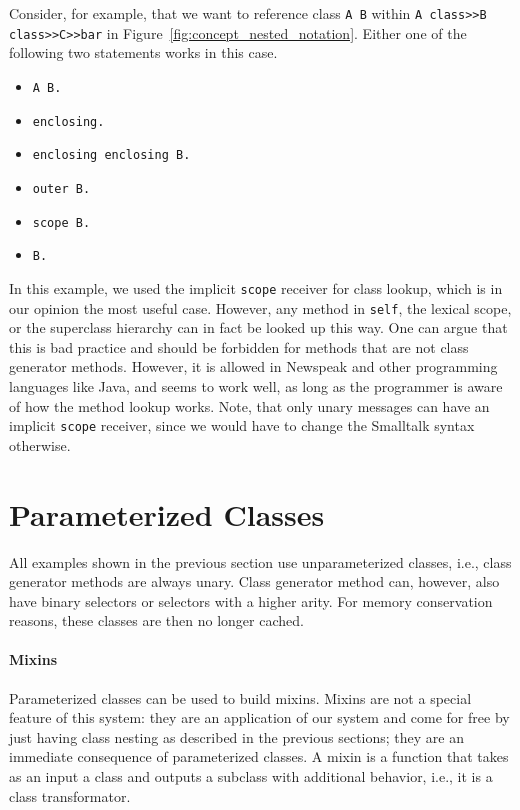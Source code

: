 Consider, for example, that we want to reference class \texttt{A B} within \texttt{A class>>B class>>C>>bar} in Figure~\ref{fig:concept_nested_notation}. Either one of the following two statements works in this case.

\begin{itemize}
	\item \texttt{A B.}
	\item \texttt{enclosing.}
	\item \texttt{enclosing enclosing B.}
	\item \texttt{outer B.}
	\item \texttt{scope B.}
	\item \texttt{B.}
\end{itemize}

In this example, we used the implicit \texttt{scope} receiver for class lookup, which is in our opinion the most useful case. However, any method in \texttt{self}, the lexical scope, or the superclass hierarchy can in fact be looked up this way. One can argue that this is bad practice and should be forbidden for methods that are not class generator methods. However, it is allowed in Newspeak and other programming languages like Java, and seems to work well, as long as the programmer is aware of how the method lookup works. Note, that only unary messages can have an implicit \texttt{scope} receiver, since we would have to change the Smalltalk syntax otherwise.

\section{Parameterized Classes}
All examples shown in the previous section use unparameterized classes, i.e., class generator methods are always unary. Class generator method can, however, also have binary selectors or selectors with a higher arity. For memory conservation reasons, these classes are then no longer cached.

\paragraph{Mixins}
Parameterized classes can be used to build mixins. Mixins are not a special feature of this system: they are an application of our system and come for free by just having class nesting as described in the previous sections; they are an immediate consequence of parameterized classes. A mixin is a function that takes as an input a class and outputs a subclass with additional behavior, i.e., it is a class transformator. 

